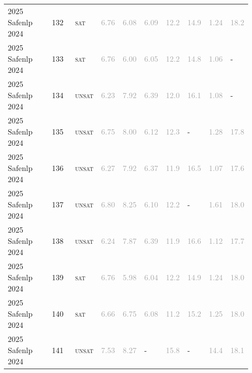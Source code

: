 \begin{center}
{\begin{longtable}{@{}llllllllll@{}}
2025 Safenlp 2024 & 132 & ~\textsc{sat} & \textcolor{darkgray}{6.76} & \textcolor{darkgray}{6.08} & \textcolor{darkgray}{6.09} & \textcolor{darkgray}{12.2} & \textcolor{darkgray}{14.9} & \textcolor{darkgray}{1.24} & \textcolor{darkgray}{18.2} \\
2025 Safenlp 2024 & 133 & ~\textsc{sat} & \textcolor{darkgray}{6.76} & \textcolor{darkgray}{6.00} & \textcolor{darkgray}{6.05} & \textcolor{darkgray}{12.2} & \textcolor{darkgray}{14.8} & \textcolor{darkgray}{1.06} & - \\
2025 Safenlp 2024 & 134 & ~\textsc{unsat} & \textcolor{darkgray}{6.23} & \textcolor{darkgray}{7.92} & \textcolor{darkgray}{6.39} & \textcolor{darkgray}{12.0} & \textcolor{darkgray}{16.1} & \textcolor{darkgray}{1.08} & - \\
2025 Safenlp 2024 & 135 & ~\textsc{unsat} & \textcolor{darkgray}{6.75} & \textcolor{darkgray}{8.00} & \textcolor{darkgray}{6.12} & \textcolor{darkgray}{12.3} & - & \textcolor{darkgray}{1.28} & \textcolor{darkgray}{17.8} \\
2025 Safenlp 2024 & 136 & ~\textsc{unsat} & \textcolor{darkgray}{6.27} & \textcolor{darkgray}{7.92} & \textcolor{darkgray}{6.37} & \textcolor{darkgray}{11.9} & \textcolor{darkgray}{16.5} & \textcolor{darkgray}{1.07} & \textcolor{darkgray}{17.6} \\
2025 Safenlp 2024 & 137 & ~\textsc{unsat} & \textcolor{darkgray}{6.80} & \textcolor{darkgray}{8.25} & \textcolor{darkgray}{6.10} & \textcolor{darkgray}{12.2} & - & \textcolor{darkgray}{1.61} & \textcolor{darkgray}{18.0} \\
2025 Safenlp 2024 & 138 & ~\textsc{unsat} & \textcolor{darkgray}{6.24} & \textcolor{darkgray}{7.87} & \textcolor{darkgray}{6.39} & \textcolor{darkgray}{11.9} & \textcolor{darkgray}{16.6} & \textcolor{darkgray}{1.12} & \textcolor{darkgray}{17.7} \\
2025 Safenlp 2024 & 139 & ~\textsc{sat} & \textcolor{darkgray}{6.76} & \textcolor{darkgray}{5.98} & \textcolor{darkgray}{6.04} & \textcolor{darkgray}{12.2} & \textcolor{darkgray}{14.9} & \textcolor{darkgray}{1.24} & \textcolor{darkgray}{18.0} \\
2025 Safenlp 2024 & 140 & ~\textsc{sat} & \textcolor{darkgray}{6.66} & \textcolor{darkgray}{6.75} & \textcolor{darkgray}{6.08} & \textcolor{darkgray}{11.2} & \textcolor{darkgray}{15.2} & \textcolor{darkgray}{1.25} & \textcolor{darkgray}{18.0} \\
2025 Safenlp 2024 & 141 & ~\textsc{unsat} & \textcolor{darkgray}{7.53} & \textcolor{darkgray}{8.27} & - & \textcolor{darkgray}{15.8} & - & \textcolor{darkgray}{14.4} & \textcolor{darkgray}{18.1} \\

\end{longtable}}
\end{center}
